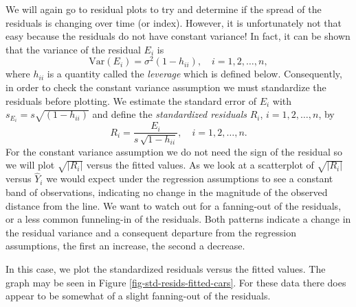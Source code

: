 \documentclass[captions=tableheading]{scrbook}
\begin{document}
We will again go to residual plots to try and determine if the spread of the residuals is changing over time (or index). However, it is unfortunately not that easy because the residuals do not have constant variance! In fact, it can be shown that the variance of the residual \(E_{i}\) is 
\begin{equation}
\mbox{Var$(E_{i})$}=\sigma^{2}(1-h_{ii}),\quad i=1,2,\ldots,n,
\end{equation}
where \(h_{ii}\) is a quantity called the \emph{leverage} which is defined below. Consequently, in order to check the constant variance assumption we must standardize the residuals before plotting. We estimate the standard error of \(E_{i}\) with \(s_{E_{i}}=s\sqrt{(1-h_{ii})}\) and define the \emph{standardized residuals} \(R_{i}\), \(i=1,2,\ldots,n\), by 
\begin{equation} 
R_{i}=\frac{E_{i}}{s\,\sqrt{1-h_{ii}}},\quad i=1,2,\ldots,n.
\end{equation}
For the constant variance assumption we do not need the sign of the residual so we will plot \(\sqrt{|R_{i}|}\) versus the fitted values. As we look at a scatterplot of \(\sqrt{|R_{i}|}\) versus \(\hat{Y}_{i}\) we would expect under the regression assumptions to see a constant band of observations, indicating no change in the magnitude of the observed distance from the line. We want to watch out for a fanning-out of the residuals, or a less common funneling-in of the residuals. Both patterns indicate a change in the residual variance and a consequent departure from the regression assumptions, the first an increase, the second a decrease.

In this case, we plot the standardized residuals versus the fitted values. The graph may be seen in Figure \ref{fig-std-resids-fitted-cars}. For these data there does appear to be somewhat of a slight fanning-out of the residuals.
\end{document}
